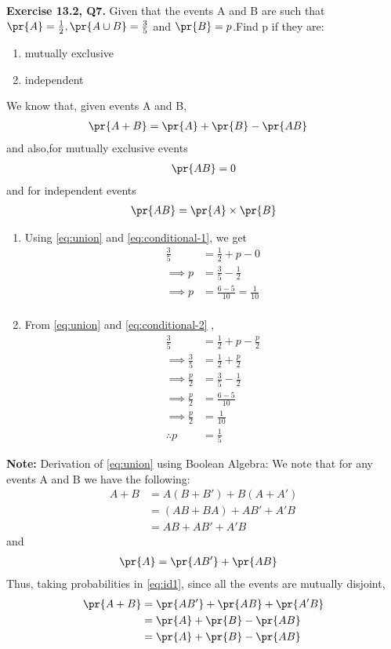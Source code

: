 \documentclass[journal,12pt,twocolumn]{IEEEtran}
\begin{document}
\noindent \textbf{Exercise 13.2, Q7.} Given that the events A and B are such that $\pr{A}= \frac{1}{2}, \pr{A\cup B} = \frac{3}{5}$ and $\pr{B}=p $.Find p if they are:
\begin{enumerate}[label=(\roman{enumi})]
\item mutually exclusive
\item independent
\end{enumerate}
\solution We know that, given events A and B,
\begin{align}
\pr{A + B} &= \pr{A} + \pr{B} - \pr{AB} 
\label{eq:union}
\end{align}
and also,for mutually exclusive events
\begin{align}
\pr{AB} = 0
\label{eq:conditional-1}
\end{align}
and for independent events
\begin{align}
\pr{AB} = \pr{A}\times\pr{B}
\label{eq:conditional-2}
\end{align}
\begin{enumerate}[label=(\roman{enumi})]
\item Using \eqref{eq:union} and \eqref{eq:conditional-1}, we get 
\begin{align}
\frac{3}{5} &= \frac{1}{2} + p - 0 \\
\implies p &= \frac{3}{5} - \frac{1}{2}\\
\implies p &= \frac{6-5}{10} =\frac{1}{10}\\
\label{sol:1}
\end{align}
\item From \eqref{eq:union} and \eqref{eq:conditional-2} ,
\begin{align}
\frac{3}{5} &= \frac{1}{2} + p -\frac{p}{2} \\
\implies \frac{3}{5} &= \frac{1}{2} +\frac{p}{2} \\
\implies \frac{p}{2} &= \frac{3}{5} - \frac{1}{2}\\
\implies \frac{p}{2} &= \frac{6-5}{10}\\
\implies \frac{p}{2} &= \frac{1}{10}\\
\therefore p &= \frac{1}{5}
\label{sol:2}
\end{align}
\end{enumerate}
\noindent \textbf{Note:} Derivation of \eqref{eq:union} using Boolean Algebra:
\noindent We note that for any events A and B we have the following:
\begin{align}
A + B &= A(B + B') + B(A + A') \\
&= (AB + BA) + AB' + A'B \\
&= AB + AB' + A'B
\label{eq:id1}
\end{align}
and
\begin{align}
\pr{A} &= \pr{AB'} + \pr{AB} 
\label{eq:id2}
\end{align}
Thus, taking probabilities in \eqref{eq:id1}, since all the events are mutually disjoint,
\begin{align}
\pr{A + B} &= \pr{AB'} + \pr{AB} + \pr{A'B} \\
&= \pr{A} + \pr{B} - \pr{AB} \\
&= \pr{A} + \pr{B} - \pr{AB}
\label{eq:derive}
\end{align}
\end{document}
